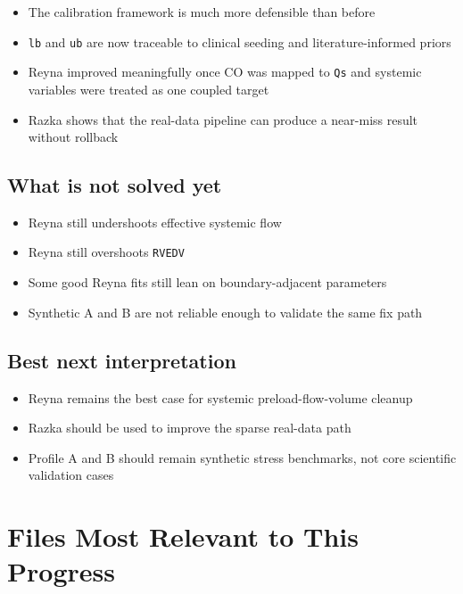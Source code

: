 \documentclass[11pt,a4paper]{article}
\begin{document}
\begin{itemize}[leftmargin=1.5em]
    \item The calibration framework is much more defensible than before
    \item \texttt{lb} and \texttt{ub} are now traceable to clinical seeding and
    literature-informed priors
    \item Reyna improved meaningfully once CO was mapped to \texttt{Qs} and
    systemic variables were treated as one coupled target
    \item Razka shows that the real-data pipeline can produce a near-miss result
    without rollback
\end{itemize}

\subsection{What is not solved yet}

\begin{itemize}[leftmargin=1.5em]
    \item Reyna still undershoots effective systemic flow
    \item Reyna still overshoots \texttt{RVEDV}
    \item Some good Reyna fits still lean on boundary-adjacent parameters
    \item Synthetic A and B are not reliable enough to validate the same fix path
\end{itemize}

\subsection{Best next interpretation}

\begin{itemize}[leftmargin=1.5em]
    \item Reyna remains the best case for systemic preload-flow-volume cleanup
    \item Razka should be used to improve the sparse real-data path
    \item Profile A and B should remain synthetic stress benchmarks, not core
    scientific validation cases
\end{itemize}

\section{Files Most Relevant to This Progress}
\end{document}
